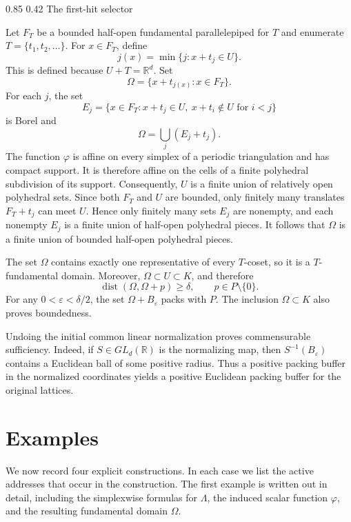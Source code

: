 \documentclass[11pt,reqno]{amsart}
\makeatletter
\numberwithin{equation}{section}
\renewcommand\subsection{\@startsection{subsection}{2}{\z@}%
  {0.85\baselineskip \@plus 0.25\baselineskip \@minus 0.10\baselineskip}%
  {0.42\baselineskip}%
  {\normalfont\bfseries}}
\theoremstyle{definition}
\theoremstyle{remark}
\newcommand{\R}{\mathbb R}
\newcommand{\eps}{\varepsilon}
\newcommand{\dist}{\operatorname{dist}}
\makeatother
\begin{document}
\subsection{The first-hit selector}\label{sec:first-hit-selector}

Let $F_T$ be a bounded half-open fundamental parallelepiped for $T$ and enumerate $T=\{t_1,t_2,\ldots\}$.
For $x\in F_T$, define
\[
 j(x)=\min\{j:x+t_j\in U\}.
\]
This is defined because $U+T=\R^d$.  Set
\begin{equation}\label{eq:first-hit-Omega}
 \Omega=\{x+t_{j(x)}:x\in F_T\}.
\end{equation}
For each $j$, the set
\[
 E_j=\{x\in F_T:x+t_j\in U,\ x+t_i\notin U\text{ for }i<j\}
\]
is Borel and
\[
 \Omega=\bigcup_j(E_j+t_j).
\]
The function $\varphi$ is affine on every simplex of a periodic
triangulation and has compact support.  It is therefore affine on the cells
of a finite polyhedral subdivision of its support.  Consequently, $U$ is a
finite union of relatively open polyhedral sets.  Since both $F_T$ and $U$
are bounded, only finitely many translates $F_T+t_j$ can meet $U$.  Hence
only finitely many sets $E_j$ are nonempty, and each nonempty $E_j$ is a
finite union of half-open polyhedral pieces.  It follows that $\Omega$ is a
finite union of bounded half-open polyhedral pieces.

The set $\Omega$ contains exactly one representative of every
$T$-coset, so it is a $T$-fundamental domain.  Moreover,
$\Omega\subset U\subset K$, and therefore
\[
 \dist(\Omega,\Omega+p)\ge\delta,
 \qquad p\in P\setminus\{0\}.
\]
For any $0<\eps<\delta/2$, the set $\Omega+B_\eps$ packs with $P$.  The inclusion
$\Omega\subset K$ also proves boundedness.

Undoing the initial common linear normalization proves commensurable
sufficiency.  Indeed, if $S\in GL_d(\R)$ is the normalizing map, then
$S^{-1}(B_\eps)$ contains a Euclidean ball of some positive radius.  Thus a
positive packing buffer in the normalized coordinates yields a positive
Euclidean packing buffer for the original lattices.


\section{Examples}\label{sec:commensurable-examples}

We now record four explicit constructions. In each case we list the active
addresses that occur in the construction. The first example is written out in
detail, including the simplexwise formulas for $\Lambda$, the induced scalar
function $\varphi$, and the resulting fundamental domain $\Omega$.
\end{document}
